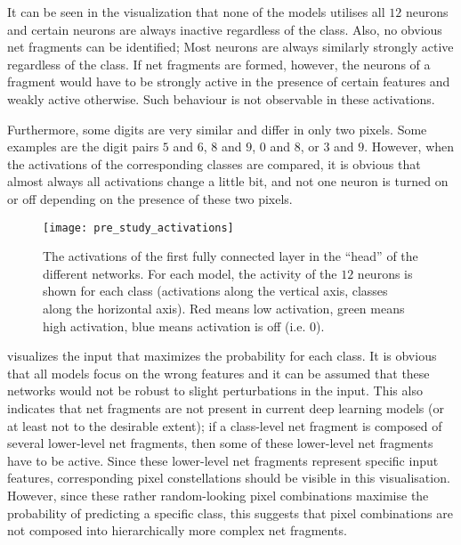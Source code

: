 It can be seen in the visualization that none of the models utilises all $12$ neurons and certain neurons are always inactive regardless of the class.
Also, no obvious net fragments can be identified;
Most neurons are always similarly strongly active regardless of the class.
If net fragments are formed, however, the neurons of a fragment would have to be strongly active in the presence of certain features and weakly active otherwise.
Such behaviour is not observable in these activations.

Furthermore, some digits are very similar and differ in only two pixels.
Some examples are the digit pairs $5$ and $6$, $8$ and $9$, $0$ and $8$, or $3$ and $9$.
However, when the activations of the corresponding classes are compared, it is obvious that almost always all activations change a little bit, and not one neuron is turned on or off depending on the presence of these two pixels.

\begin{figure}[h]
    \centering
    \texttt{[image: pre\_study\_activations]}
    \caption[Network Activations for Straight Line Digits Dataset]{The activations of the first fully connected layer in the ``head'' of the different networks. For each model, the activity of the $12$ neurons is shown for each class (activations along the vertical axis, classes along the horizontal axis). Red means low activation, green means high activation, blue means activation is off (i.e. $0$).}
\end{figure}


 visualizes the input that maximizes the probability for each class.
It is obvious that all models focus on the wrong features and it can be assumed that these networks would not be robust to slight perturbations in the input.
This also indicates that net fragments are not present in current deep learning models (or at least not to the desirable extent);
if a class-level net fragment is composed of several lower-level net fragments, then some of these lower-level net fragments have to be active.
Since these lower-level net fragments represent specific input features, corresponding pixel constellations should be visible in this visualisation.
However, since these rather random-looking pixel combinations maximise the probability of predicting a specific class, this suggests that pixel combinations are not composed into hierarchically more complex net fragments.

